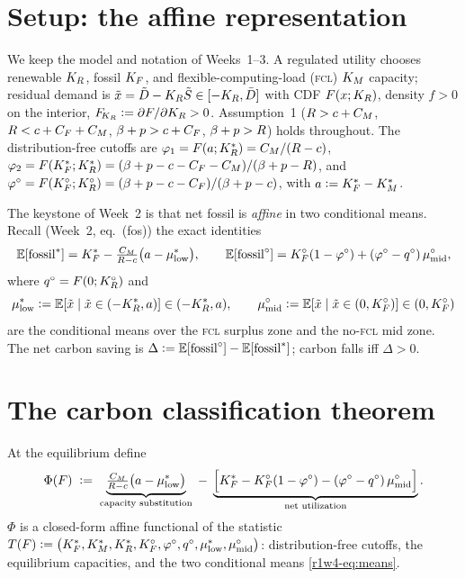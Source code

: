 \section{Setup: the affine representation}\label{r1w4-sec:setup}

We keep the model and notation of Weeks~1--3. A regulated utility chooses renewable
$K_R$, fossil $K_F$, and flexible-computing-load (\textsc{fcl}) $K_M$ capacity; residual
demand is $\tilde x=\tilde D-K_R\tilde S\in[-K_R,\bar D]$ with CDF $F(x;K_R)$, density
$f>0$ on the interior, $F_{\!K_R}\vcentcolon=\partial F/\partial K_R>0$. Assumption~1
($R>c+C_M$, $R<c+C_F+C_M$, $\beta+p>c+C_F$, $\beta+p>R$) holds throughout. The
distribution-free cutoffs are
$\varphi_1=F(a;K_R^{*})=C_M/(R-c)$, $\varphi_2=F(K_F^{*};K_R^{*})=(\beta+p-c-C_F-C_M)/(\beta+p-R)$, and
$\varphi^{\circ}=F(K_F^{\circ};K_R^{\circ})=(\beta+p-c-C_F)/(\beta+p-c)$, with $a\vcentcolon=K_F^{*}-K_M^{*}$.

The keystone of Week~2 is that net fossil is \emph{affine} in two conditional means.
Recall (Week~2, eq.~(fos)) the exact identities
\begin{equation}\label{r1w4-eq:fos}
  \mathbb{E}[\mathrm{fossil}^{*}]=K_F^{*}-\tfrac{C_M}{R-c}\big(a-\mu^{*}_{\mathrm{low}}\big),\qquad
  \mathbb{E}[\mathrm{fossil}^{\circ}]=K_F^{\circ}(1-\varphi^{\circ})+(\varphi^{\circ}-q^{\circ})\,\mu^{\circ}_{\mathrm{mid}},
\end{equation}
where $q^{\circ}=F(0;K_R^{\circ})$ and
\begin{equation}\label{r1w4-eq:means}
  \mu^{*}_{\mathrm{low}}\vcentcolon=\mathbb{E}[\tilde x\mid\tilde x\in(-K_R^{*},a)]\in(-K_R^{*},a),\qquad
  \mu^{\circ}_{\mathrm{mid}}\vcentcolon=\mathbb{E}[\tilde x\mid\tilde x\in(0,K_F^{\circ})]\in(0,K_F^{\circ})
\end{equation}
are the conditional means over the \textsc{fcl} surplus zone and the no-\textsc{fcl}
mid zone. The net carbon saving is $\Delta\vcentcolon=\mathbb{E}[\mathrm{fossil}^{\circ}]-\mathbb{E}[\mathrm{fossil}^{*}]$;
carbon falls iff $\Delta>0$.

\section{The carbon classification theorem}\label{r1w4-sec:classify}

\begin{cardef}
At the equilibrium define
\begin{equation}\label{r1w4-eq:Phi}
  \Phi(F)\;\vcentcolon=\;
  \underbrace{\tfrac{C_M}{R-c}\big(a-\mu^{*}_{\mathrm{low}}\big)}_{\text{capacity substitution}}
  \;-\;
  \underbrace{\Big[K_F^{*}-K_F^{\circ}(1-\varphi^{\circ})-(\varphi^{\circ}-q^{\circ})\,\mu^{\circ}_{\mathrm{mid}}\Big]}_{\text{net utilization}} .
\end{equation}
$\Phi$ is a closed-form affine functional of the statistic
$T(F)\vcentcolon=\big(K_F^{*},K_M^{*},K_R^{*},K_F^{\circ},\varphi^{\circ},q^{\circ},\mu^{*}_{\mathrm{low}},\mu^{\circ}_{\mathrm{mid}}\big)$: distribution-free
cutoffs, the equilibrium capacities, and the two conditional means \eqref{r1w4-eq:means}.
\end{cardef}

